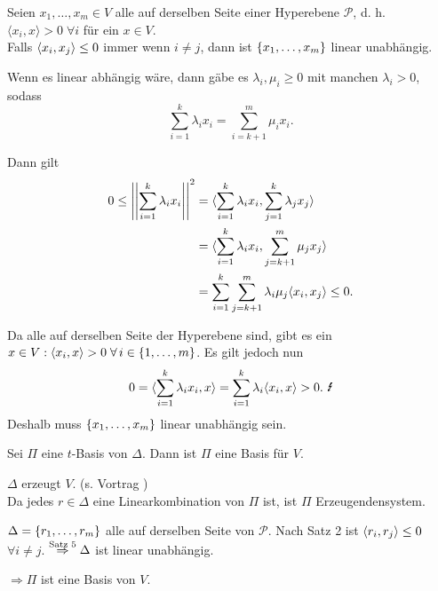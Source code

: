 \documentclass{article}
\begin{document}
\begin{satz} %
    Seien \( x_1, \ldots, x_m \in V \) alle auf derselben 
    Seite einer Hyperebene \( \mathscr{P} \), 
    d. h. \( \langle x_i, x \rangle > 0 \;\forall i \) für 
    ein \( x\in V \). \\
    Falls \( \langle x_i, x_j \rangle \leq 0 \) immer wenn 
    \( i \neq j \), dann ist \( \{x_1, \ldots, x_m\} \) 
    linear unabhängig.
\end{satz}

\begin{bew}
    Wenn es linear abhängig wäre, dann gäbe es 
    \( \lambda_i, \mu_i \geq 0 \) mit 
    manchen \( \lambda_i > 0 \), sodass 
    \[ \sum_{i=1}^k \lambda_i x_i 
    = \sum_{i=k+1}^m \mu_i x_i. \]

    Dann gilt 
    \begin{align*}
        0 \leq \norm{\sum_{i=1}^k \lambda_i x_i}^2 
        &= \scalarprod{\sum_{i=1}^{k} \lambda_{i} x_{i}}{
        \sum_{j=1}^{k} \lambda_{j} x_{j}} \\
        &= \scalarprod{\sum_{i=1}^{k} \lambda_{i} x_{i}}{
        \sum_{j=k+1}^{m} \mu_{j} x_{j}} \\
        &= \sum_{i=1}^{k} \sum_{j=k+1}^{m} \lambda_{i} \mu_{j}
        \scalarprod{x_i}{x_j} 
        \leq 0. %
    \end{align*}

    Da alle auf derselben Seite der Hyperebene sind, 
    gibt es ein \( x \in V: \scalarprod{x_i}{x} > 0 
    \;\forall i \in \set{1,\ldots, m} \).
    Es gilt jedoch nun 
    \[ 0 = \scalarprod{\sum_{i=1}^{k} \lambda_i x_i}{x} 
    = \sum_{i=1}^k \lambda_i \scalarprod{x_i}{x} > 0. \text{ \Lightning{}} \]
    Deshalb muss \( \{x_1, \ldots, x_m\} \) linear 
    unabhängig sein.
\end{bew}

\begin{satz} %
    Sei \( \Pi \) eine \(t\)-Basis von \( \Delta \). Dann ist 
    \( \Pi \) eine Basis für \( V \).
\end{satz}
\begin{bew}
    \( \Delta \) erzeugt \( V \). (s. Vortrag )\\
    Da jedes \( r \in \Delta \) eine Linearkombination von \( \Pi \) ist, 
    ist \( \Pi \) Erzeugendensystem.

    \( \Delta = \{r_1, \ldots, r_m\} \) alle auf derselben Seite 
    von \( \mathscr{P} \). Nach Satz 2 ist \( \langle r_i, r_j \rangle \leq 0 \)
    \( \forall i \neq j \). \( \overset{\text{Satz 5}}{\Rightarrow} \Delta \) 
    ist linear unabhängig.

    \( \Rightarrow \Pi \) ist eine Basis von \(V\).
\end{bew}
\end{document}
